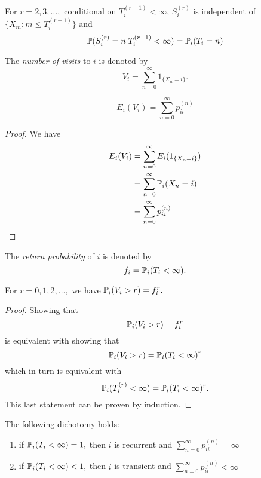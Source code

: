 \begin{thm}[Lemma 1.5.1]
For \(r=2,3,\ldots ,\) conditional on \(T_{i}^{(r-1)}<\infty \), \(S_{i}^{(r)}\) is independent of
\(\{X_{m}:m\leq T_{i}^{(r-1)}\}\) and
\[
\Bbb{P}(S_{i}^{(r)}=n|T_{i}^{(r-1)}<\infty )=\Bbb{P}_{i}(T_{i}=n)
\]
\end{thm}

\begin{defn}
The \emph{number of visits} to \(i\) is denoted by
\[
V_{i}=\sum _{n=0}^\infty 1_{\{X_{n}=i\}}.
\]

\end{defn}

\begin{thm}
\[
E_{i}(V_{i})=\sum _{n=0}^\infty p_{ii}^{(n)}
\]
\end{thm}

\begin{proof}
We have
\begin{align*}
E_{i}(V_{i}) &=\sum _{n=0}^\infty E_{i}(1_{\{X_{n}=i\}}) \\
&=\sum _{n=0}^\infty  \Bbb{P}_{i}(X_{n}=i) \\
&=\sum _{n=0}^\infty p_{ii}^{(n)} 
\end{align*}
\end{proof}

\begin{defn}
The \emph{return probability} of \(i\) is denoted by
\[
f_{i}=\Bbb{P}_{i}(T_{i}<\infty ).
\]
\end{defn}

\begin{thm}[Lemma 1.5.2]
For \(r=0,1,2,\ldots ,\) we have \(\Bbb{P}_{i}(V_{i}>r)=f_{i}^r.\)
\end{thm}

\begin{proof}
Showing that
\[
\Bbb{P}_{i}(V_{i}>r)=f_{i}^r
\]
is equivalent with showing that
\[
\Bbb{P}_{i}(V_{i}>r)=\Bbb{P}_{i}(T_{i}<\infty )^r
\]
which in turn is equivalent with
\[
\Bbb{P}_{i}(T_{i}^{(r)}<\infty )=\Bbb{P}_{i}(T_{i}<\infty )^r.
\]
This last statement can be proven by induction.
\end{proof}

\begin{thm}[Theorem 1.5.3]
The following dichotomy holds:

\begin{enumerate}
  \item if \(\Bbb{P}_{i}(T_{i}<\infty )=1,\) then \(i\) is recurrent and \(\sum _{n=0}^\infty p_{ii}^{(n)}=\infty \)
  \item if \(\Bbb{P}_{i}(T_{i}<\infty )<1,\) then \(i\) is transient and \(\sum _{n=0}^\infty  p_{ii}^{(n)}<\infty \)
\end{enumerate}
\end{thm}


